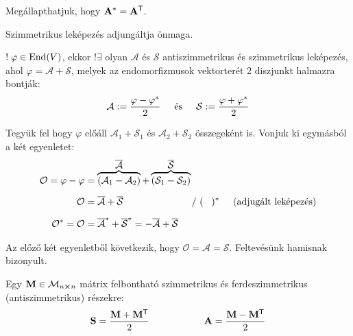 \documentclass[main.tex]{subfiles}
\begin{document}
Megállapthatjuk, hogy $\mathbf{A}^{*} = \mathbf{A}^{\mathsf{T}}$.


 Szimmetrikus leképezés adjungáltja önmaga.



$! \; \varphi \in \mathrm{End}(V)$, ekkor $!\exists$ olyan
$\mathcal{A}$ és $\mathcal{S}$ antiszimmetrikus és szimmetrikus
leképezés, ahol $\varphi = \mathcal{A} + \mathcal{S}$, melyek
az endomorfizmusok vektorterét 2 diszjunkt halmazra bontják:
\begin{equation*}
  \mathcal{A} := \frac{\varphi - \varphi^{*}}{2}
  \hspace{5mm} \text{és} \hspace{5mm}
  \mathcal{S} := \frac{\varphi + \varphi^{*}}{2}
\end{equation*}



Tegyük fel hogy $\varphi$ előáll
$\mathcal{A}_1 + \mathcal{S}_1$ és
$\mathcal{A}_2 + \mathcal{S}_2$
összegeként is. Vonjuk ki egymásból
a két egyenletet:
\begin{align*}
  \mathcal{O}
  = \varphi - \varphi
   & = \overbrace{ \left(
    \mathcal{A}_1 - \mathcal{A}_2
    \right)}^{\displaystyle\overline{\mathcal{A}}}
  + \overbrace{ \left(
    \mathcal{S}_1 - \mathcal{S}_2
    \right)}^{\displaystyle\mathcal{\overline{S}}}
  \\[
  2mm
  ]
  \mathcal{O}
   & = \mathcal{\overline{A}} + \mathcal{\overline{S}}
  \hspace{25mm}
  /\ (\;\;\;)^{*}
  \hspace{5mm}
  (\text{adjugált leképezés})
  \\[
  2mm
  ]
  \mathcal{O}^{*}
  = \mathcal{O}
   & = \mathcal{\overline{A}^{*}} + \mathcal{\overline{S}^{*}}
  = -\mathcal{\overline{A}} + \mathcal{\overline{S}}
\end{align*}

Az előző két egyenletből következik, hogy
$\mathcal{O = A = S}$. Feltevésünk hamisnak bizonyult.



Egy $\mathbf{M} \in \mathcal{M}_{n \cross n}$
mátrix felbontható szimmetrikus és
ferdeszimmetrikus (antiszimmetrikus) részekre:
\begin{equation*}
  \rmat{S} = \frac{\rmat{M} + \rmat{M}^\transpose}{2}
  \hspace{20mm}
  \rmat{A} = \frac{\rmat{M} - \rmat{M}^\transpose}{2}
\end{equation*}
\end{document}
